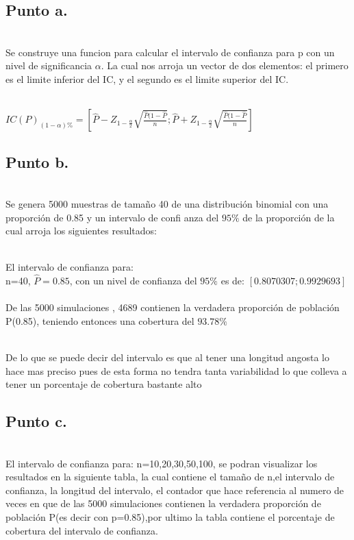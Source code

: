 \documentclass[letterpaper,12pt,onecolumn,titlepage]{article}
\begin{document}
\subsection{Punto a.}

~\\ Se construye una funcion para calcular el intervalo de confianza para p con un nivel de significancia $\alpha$. La cual nos arroja un vector de dos elementos: el primero es el limite inferior del IC, y el segundo es el limite superior del IC.

~\\ $IC(P)_{(1-\alpha)\%}=\left[\hat{P}-Z_{1-\frac{\alpha}{2}}\sqrt{\frac{\hat{P}(1-\hat{P}}{n}};\hat{P}+Z_{1-\frac{\alpha}{2}}\sqrt{\frac{\hat{P}(1-\hat{P}}{n}}\right]$


\subsection{Punto b.}

~\\Se genera 5000 muestras de tama\~{n}o 40 de una distribuci\'{o}n binomial con una proporci\'{o}n de 0.85 y un intervalo de confi 
anza del $95\%$ de la proporci\'{o}n de la cual arroja los siguientes resultados:


~\\El intervalo de confianza para:
~\\ n=40, $\hat{P}=0.85$, con un nivel de confianza del $95\%$ es de: $[0.8070307 ;0.9929693 ]$
~\\ De las 5000 simulaciones , 4689 contienen la verdadera proporci\'{o}n de poblaci\'{o}n P(0.85), teniendo entonces una cobertura del $93.78\%$

~\\De lo que se puede decir del intervalo es que al tener una longitud angosta lo hace mas preciso pues de esta forma no tendra tanta variabilidad lo que colleva a tener un porcentaje de cobertura bastante alto


\subsection{Punto c.}

~\\El intervalo de confianza para: n=10,20,30,50,100, se podran visualizar los resultados en la siguiente tabla, la cual contiene el tama\~{n}o de n,el intervalo de confianza, la longitud del intervalo, el contador que hace referencia al numero de veces en que de las 5000 simulaciones contienen la verdadera proporci\'{o}n de poblaci\'{o}n P(es decir con p=0.85),por ultimo la tabla contiene el porcentaje de cobertura del intervalo de confianza.
\end{document}
